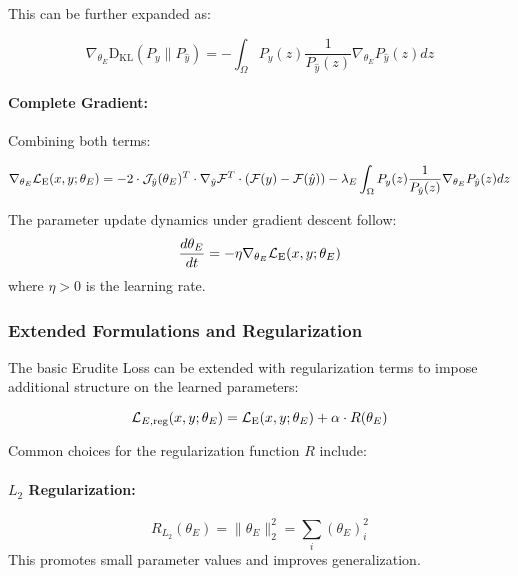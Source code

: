 This can be further expanded as:

\begin{equation}
\nabla_{\theta_E} \mathrm{D_{KL}}(P_y \| P_{\hat{y}}) = -\int_{\Omega} P_y(z) \frac{1}{P_{\hat{y}}(z)} \nabla_{\theta_E} P_{\hat{y}}(z) dz
\end{equation}

\paragraph{Complete Gradient:}
Combining both terms:

\begin{equation}
\nabla_{\theta_E} \mathcal{L}_{\text{E}}(x, y; \theta_E) = -2 \cdot \mathcal{J}_{\hat{y}}(\theta_E)^T \cdot \nabla_{\hat{y}} \mathcal{F}^T \cdot (\mathcal{F}(y) - \mathcal{F}(\hat{y})) - \lambda_E \int_{\Omega} P_y(z) \frac{1}{P_{\hat{y}}(z)} \nabla_{\theta_E} P_{\hat{y}}(z) dz
\end{equation}

\begin{proposition}
The parameter update dynamics under gradient descent follow:
\begin{equation}
\frac{d\theta_E}{dt} = -\eta \nabla_{\theta_E} \mathcal{L}_{\text{E}}(x, y; \theta_E)
\end{equation}
where $\eta > 0$ is the learning rate.
\end{proposition}

\subsubsection{Extended Formulations and Regularization}

The basic Erudite Loss can be extended with regularization terms to impose additional structure on the learned parameters:

\begin{equation}
\mathcal{L}_{E,\text{reg}}(x, y; \theta_E) = \mathcal{L}_{\text{E}}(x, y; \theta_E) + \alpha \cdot R(\theta_E)
\end{equation}

Common choices for the regularization function $R$ include:

\paragraph{$L_2$ Regularization:}
\begin{equation}
R_{L_2}(\theta_E) = \|\theta_E\|_2^2 = \sum_i (\theta_E)_i^2
\end{equation}
This promotes small parameter values and improves generalization.

